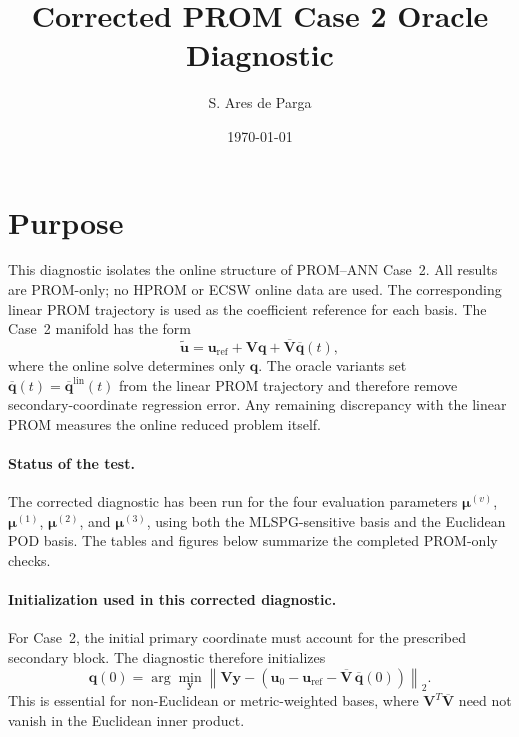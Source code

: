 \documentclass[11pt]{article}
\title{Corrected PROM Case 2 Oracle Diagnostic}
\author{S. Ares de Parga}
\date{\today}
\begin{document}
\maketitle

\section*{Purpose}
This diagnostic isolates the online structure of PROM--ANN Case~2.  All results
are PROM-only; no HPROM or ECSW online data are used.  The corresponding
linear PROM trajectory is used as the coefficient reference for each basis.  The
Case~2 manifold has the form
\begin{equation*}
\widetilde{\mathbf u}
=
\mathbf u_{\mathrm{ref}}
+
\mathbf V\mathbf q
+
\overline{\mathbf V}\overline{\mathbf q}(t),
\end{equation*}
where the online solve determines only $\mathbf q$.  The oracle variants set
$\overline{\mathbf q}(t)=\overline{\mathbf q}^{\mathrm{lin}}(t)$ from the
linear PROM trajectory and therefore remove secondary-coordinate regression
error.  Any remaining discrepancy with the linear PROM measures the online
reduced problem itself.

\paragraph{Status of the test.}
The corrected diagnostic has been run for the four evaluation parameters
$\boldsymbol\mu^{(v)}$, $\boldsymbol\mu^{(1)}$,
$\boldsymbol\mu^{(2)}$, and $\boldsymbol\mu^{(3)}$, using both the
MLSPG-sensitive basis and the Euclidean POD basis.  The tables and figures
below summarize the completed PROM-only checks.

\paragraph{Initialization used in this corrected diagnostic.}
For Case~2, the initial primary coordinate must account for the prescribed
secondary block.  The diagnostic therefore initializes
\begin{equation*}
\mathbf q(0)
=
\arg\min_{\mathbf y}
\left\|
\mathbf V\mathbf y
-
\left(
\mathbf u_0-\mathbf u_{\mathrm{ref}}
-
\overline{\mathbf V}\,\overline{\mathbf q}(0)
\right)
\right\|_2 .
\end{equation*}
This is essential for non-Euclidean or metric-weighted bases, where
$\mathbf V^T\overline{\mathbf V}$ need not vanish in the Euclidean inner
product.
\end{document}
